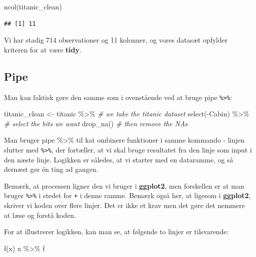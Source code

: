 \documentclass[
]{book}
\newenvironment{Shaded}{\begin{snugshade}}{\end{snugshade}}
\newcommand{\CommentTok}[1]{\textcolor[rgb]{0.56,0.35,0.01}{\textit{#1}}}
\newcommand{\FunctionTok}[1]{\textcolor[rgb]{0.00,0.00,0.00}{#1}}
\newcommand{\NormalTok}[1]{#1}
\newcommand{\OtherTok}[1]{\textcolor[rgb]{0.56,0.35,0.01}{#1}}
\newcommand{\SpecialCharTok}[1]{\textcolor[rgb]{0.00,0.00,0.00}{#1}}
\begin{document}
\begin{Shaded}
\begin{Highlighting}[]
\FunctionTok{ncol}\NormalTok{(titanic\_clean)}
\end{Highlighting}
\end{Shaded}

\begin{verbatim}
## [1] 11
\end{verbatim}

Vi har stadig 714 observationer og 11 kolonner, og vores datasæt opfylder kriteren for at være \textbf{tidy}.

\hypertarget{pipe}{%
\subsection{Pipe}\label{pipe}}

Man kan faktisk gøre den samme som i ovenstående ved at bruge pipe \texttt{\%\textgreater{}\%}:

\begin{Shaded}
\begin{Highlighting}[]
\NormalTok{titanic\_clean }\OtherTok{\textless{}{-}}\NormalTok{ titanic }\SpecialCharTok{\%\textgreater{}\%} \CommentTok{\# we take the titanic dataset}
    \FunctionTok{select}\NormalTok{(}\SpecialCharTok{{-}}\NormalTok{Cabin) }\SpecialCharTok{\%\textgreater{}\%} \CommentTok{\# select the bits we want}
    \FunctionTok{drop\_na}\NormalTok{() }\CommentTok{\# then remove the NAs}
\end{Highlighting}
\end{Shaded}

Man bruger pipe \%\textgreater\% til kat ombinere funktioner i samme kommando - linjen slutter med \texttt{\%\textgreater{}\%}, der fortæller, at vi skal bruge resultatet fra den linje som input i den næste linje. Logikken er således, at vi starter med en dataramme, og så dernæst gør én ting ad gangen.

Bemærk, at processen ligner den vi bruger i \textbf{ggplot2}, men forskellen er at man bruger \texttt{\%\textgreater{}\%} i stedet for \texttt{+} i denne ramme. Bemærk også her, at ligesom i \textbf{ggplot2}, skriver vi koden over flere linjer. Det er ikke et krav men det gøre det nemmere at læse og forstå koden.

For at illustrerer logikken, kan man se, at følgende to linjer er tilsvarende:

\begin{Shaded}
\begin{Highlighting}[]
\FunctionTok{f}\NormalTok{(x)}
\NormalTok{x }\SpecialCharTok{\%\textgreater{}\%}\NormalTok{ f}
\end{Highlighting}
\end{Shaded}
\end{document}

